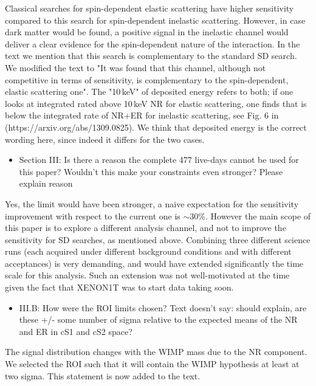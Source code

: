 \documentclass{article}
\begin{document}
Classical searches for spin-dependent elastic scattering have higher sensitivity compared to this search for 
spin-dependent inelastic scattering. However, in case dark matter would be found, a positive signal in the inelastic channel would deliver a clear evidence for  
the spin-dependent nature of the interaction. 
In the text we mention that this search is complementary to the standard SD search.  We modified the text to "It was found that this channel,  
although not competitive in terms of sensitivity,  
is complementary to the spin-dependent, elastic scattering one".
The "10\,keV" of deposited energy refers to both; if one looks at integrated rated above 10\,keV NR for elastic scattering, one  
finds that is below the integrated rate of  NR+ER for inelastic scattering, see Fig. 6 in (https://arxiv.org/abs/1309.0825).
We think that deposited energy is the correct wording here, since indeed it differs for the two cases.

\begin{itemize}
	\item {\color{blue} 
Section III: Is there a reason the complete 477 live-days cannot be
used for this paper? Wouldn’t this make your constraints even
stronger? Please explain reason}
\end{itemize}

Yes, the limit would have been stronger, a naive expectation for the sensitivity improvement with respect to the current one is $\sim$30\%.
However the main scope of this paper is to explore a different analysis channel, and not to improve the sensitivity for SD searches, as mentioned above.
Combining three different science runs (each acquired under different background conditions and with different acceptances) is very demanding,
and would have extended significantly the time scale for this analysis. Such an extension  was not well-motivated at the time given the fact that XENON1T was to start data taking soon.


\begin{itemize}
	\item {\color{blue} 
III.B: How were the ROI limits chosen? Text doesn’t say: should
explain, are these +/- some number of sigma relative to the expected
means of the NR and ER in cS1 and cS2 space?}
\end{itemize}

The signal distribution changes with the WIMP mass due to the NR component.
We selected the ROI such that it will contain the WIMP hypothesis at least at two 
sigma. This statement is now added to the text.
\end{document}

